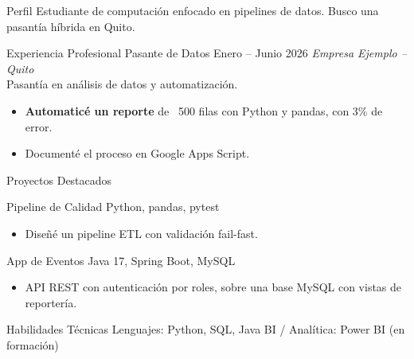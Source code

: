 \documentclass[11pt, letterpaper]{article}
\newcommand{\cvsection}[1]{#1}
\newcommand{\cventry}[2]{#1 #2}
\newcommand{\skillrow}[2]{#1 #2}
\begin{document}
\cvsection{Perfil}
Estudiante de computación enfocado en pipelines de datos. Busco una pasantía híbrida en Quito. %

\cvsection{Experiencia Profesional}
\cventry{Pasante de Datos}{Enero -- Junio 2026}
{\small\textit{Empresa Ejemplo -- Quito}}\\[2pt]
Pasantía en análisis de datos y automatización.

\begin{itemize}
  \item \textbf{Automaticé un reporte} de ~500 filas con Python y pandas, con 3\% de error.
  \item Documenté el proceso en Google Apps Script.
\end{itemize}

\cvsection{Proyectos Destacados}

\cventry{Pipeline de Calidad}{\small Python, pandas, pytest \ \href{https://ejemplo.com}{\raisebox{-0.05\height}\faGithub}}
\begin{itemize}
  \item Diseñé un pipeline ETL con validación fail-fast. %
\end{itemize}

\cventry{App de Eventos}{\small Java 17, Spring Boot, MySQL}
\begin{itemize}
  \item API REST con autenticación por roles,
    sobre una base MySQL con vistas de reportería.
\end{itemize}

\cvsection{Habilidades Técnicas}
\skillrow{Lenguajes:}{Python, SQL, Java}
\skillrow{BI / Analítica:}{Power BI (en formación)}
\end{document}
